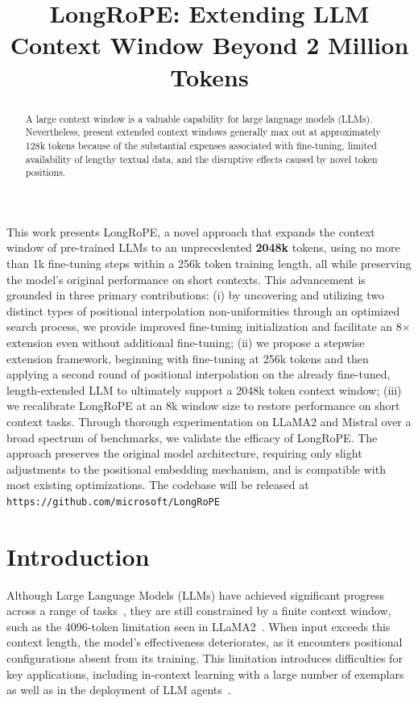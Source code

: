 \title{LongRoPE: Extending LLM Context Window Beyond 2 Million Tokens}

\begin{abstract}
A large context window is a valuable capability for large language models (LLMs). Nevertheless, present extended context windows generally max out at approximately 128k tokens because of the substantial expenses associated with fine-tuning, limited availability of lengthy textual data, and the disruptive effects caused by novel token positions.
\end{abstract}

This work presents LongRoPE, a novel approach that expands the context window of pre-trained LLMs to an unprecedented \textbf{2048k} tokens, using no more than 1k fine-tuning steps within a 256k token training length, all while preserving the model’s original performance on short contexts. This advancement is grounded in three primary contributions: (i) by uncovering and utilizing two distinct types of positional interpolation non-uniformities through an optimized search process, we provide improved fine-tuning initialization and facilitate an 8$\times$ extension even without additional fine-tuning; (ii) we propose a stepwise extension framework, beginning with fine-tuning at 256k tokens and then applying a second round of positional interpolation on the already fine-tuned, length-extended LLM to ultimately support a 2048k token context window; (iii) we recalibrate LongRoPE at an 8k window size to restore performance on short context tasks. Through thorough experimentation on LLaMA2 and Mistral over a broad spectrum of benchmarks, we validate the efficacy of LongRoPE. The approach preserves the original model architecture, requiring only slight adjustments to the positional embedding mechanism, and is compatible with most existing optimizations. The codebase will be released at \texttt{https://github.com/microsoft/LongRoPE}

\section{Introduction}

Although Large Language Models (LLMs) have achieved significant progress across a range of tasks~\cite{gpt4,llama2}, they are still constrained by a finite context window, such as the 4096-token limitation seen in LLaMA2~\cite{llama2}. When input exceeds this context length, the model’s effectiveness deteriorates, as it encounters positional configurations absent from its training. This limitation introduces difficulties for key applications, including in-context learning with a large number of exemplars~\cite{Huang2023FewerIM} as well as in the deployment of LLM agents~\cite{park2023generative,madaan2023selfrefine}.

